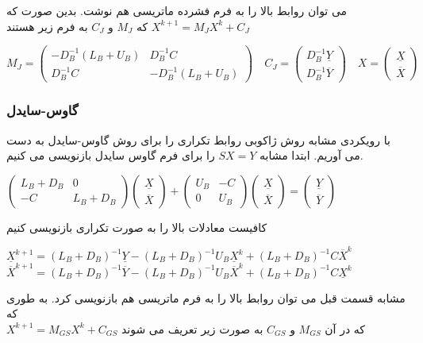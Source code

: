	می توان روابط بالا را به فرم فشرده ماتریسی هم نوشت. بدین صورت که 
	$
	X^{k+1} = M_J X^{k} + C_J 
	$
	که $ M_J $ و $ C_J $ به فرم زیر هستند 
	
	
	\begin{center}
		$
		M_J =
		\begin{pmatrix} 
		-D_B^{-1}(L_B + U_B) & D_B^{-1}C \\
		D_B^{-1}C & -D_B^{-1}(L_B + U_B) 
		\end{pmatrix} 
		\quad 
		C_J = 
		\begin{pmatrix}
		D_B^{-1}\underline{Y} \\
		D_B^{-1}\overline{Y} 
		\end{pmatrix} 
		\quad
		X = 
		\begin{pmatrix}
		\underline{X}\\ 
		\overline{X}
		\end{pmatrix}
		$
	\end{center}

	\pagebreak  

	\subsubsection{گاوس-سایدل}
	با رویکردی مشابه روش ژاکوبی روابط تکراری را برای روش گاوس-سایدل به دست می آوریم. ابتدا مشابه $ SX = Y $ را برای فرم گاوس سایدل بازنویسی می کنیم. 
	 
	 \begin{center} 
	 	$
	 	\begin{pmatrix}
	 	L_B + D_B & 0 \\
	 	-C & L_B + D_B 
	 	\end{pmatrix}
	 	\begin{pmatrix}
	 	\underline{X}\\
	 	\overline{X} 
	 	\end{pmatrix}
	 	+ 
	 	\begin{pmatrix}
	 	U_B & -C \\ 
	 	0 & U_B
	 	\end{pmatrix}
	 	\begin{pmatrix}
	 	\underline{X}\\
	 	\overline{X} 
	 	\end{pmatrix}
	 	=
	 	\begin{pmatrix}
	 	\underline{Y}\\
	 	\overline{Y} 
	 	\end{pmatrix}
	 	$\\
	 \end{center}
 	کافیست معادلات بالا را به صورت تکراری بازنویسی کنیم 
 	\begin{center}
 		$\underline{X}^{k+1} = \left(L_B + D_B\right)^{-1}\underline{Y} - \left(L_B + D_B\right)^{-1}U_B\underline{X}^k + \left(L_B + D_B\right)^{-1}C\overline{X}^k$	
 		 $\overline{X}^{k+1} = \left(L_B + D_B\right)^{-1}\overline{Y} - \left(L_B + D_B\right)^{-1}U_B\overline{X}^k + \left(L_B + D_B\right)^{-1}C\underline{X}^k$	
 	\end{center} 
 	مشابه قسمت قبل می توان روابط بالا را به فرم ماتریسی هم بازنویسی کرد. به طوری که \\
 	$ X^{k+1} = M_{GS}X^k + C_{GS} $ 
 	که در آن $M_{GS} $ و $ C_{GS}$ به صورت زیر تعریف می شوند \\
 	
